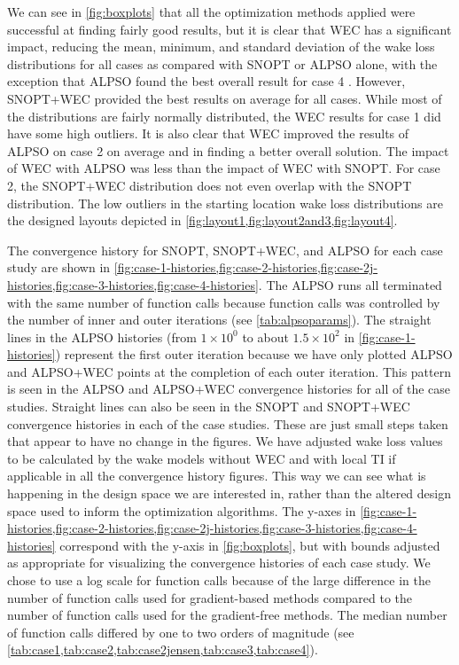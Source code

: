 \documentclass{jpconf}
\begin{document}
We can see in \cref{fig:boxplots} that all the optimization methods applied were successful at finding fairly good results, but it is clear that WEC has a significant impact, reducing the mean, minimum, and standard deviation of the wake loss distributions for all cases as compared with SNOPT or ALPSO alone, with the exception that ALPSO found the best overall result for case 4 . However, SNOPT+WEC  provided the best results on average for all cases. While most of the distributions are fairly normally distributed, the WEC results for case 1 did have some high outliers. It is also clear that WEC improved the results of ALPSO on case 2 on average and in finding a better overall solution. The impact of WEC with ALPSO was less than the impact of WEC with SNOPT. For case 2, the SNOPT+WEC distribution does not even overlap with the SNOPT distribution. The low outliers in the starting location wake loss distributions are the designed layouts depicted in \cref{fig:layout1,fig:layout2and3,fig:layout4}.

The convergence history for SNOPT, SNOPT+WEC, and ALPSO for each case study are shown in \cref{fig:case-1-histories,fig:case-2-histories,fig:case-2j-histories,fig:case-3-histories,fig:case-4-histories}. The ALPSO runs all terminated with the same number of function calls because function calls was controlled by the number of inner and outer iterations (see \cref{tab:alpsoparams}). The straight lines in the ALPSO histories (from $1\times10^0$ to about $1.5\times10^2$ in \cref{fig:case-1-histories}) represent the first outer iteration because we have only plotted ALPSO and ALPSO+WEC points at the completion of each outer iteration. This pattern is seen in the ALPSO and ALPSO+WEC convergence histories for all of the case studies. Straight lines can also be seen in the SNOPT and SNOPT+WEC convergence histories in each of the case studies. These are just small steps taken that appear to have no change in the figures. We have adjusted wake loss values to be calculated by the wake models without WEC and with local TI if applicable in all the convergence history figures. This way we can see what is happening in the design space we are interested in, rather than the altered design space used to inform the optimization algorithms. The y-axes in \cref{fig:case-1-histories,fig:case-2-histories,fig:case-2j-histories,fig:case-3-histories,fig:case-4-histories} correspond with the y-axis in \cref{fig:boxplots}, but with bounds adjusted as appropriate for visualizing the convergence histories of each case study. We chose to use a log scale for function calls because of the large difference in the number of function calls used for gradient-based methods compared to the number of function calls used for the gradient-free methods. The median number of function calls differed by one to two orders of magnitude (see \cref{tab:case1,tab:case2,tab:case2jensen,tab:case3,tab:case4}).
\end{document}

